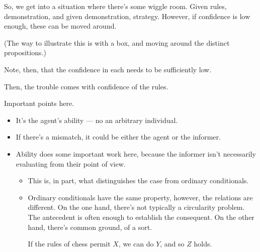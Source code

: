 \documentclass[10pt]{article}
\begin{document}
So, we get into a situation where there's some wiggle room.
Given rules, demonstration, and given demonstration, strategy.
However, if confidence is low enough, these can be moved around.

(The way to illustrate this is with a box, and moving around the distinct propositions.)

Note, then, that the confidence in each needs to be sufficiently low.

Then, the trouble comes with confidence of the rules.


Important points here.

\begin{itemize}
\item It's the agent's ability --- no an arbitrary individual.
\item If there's a mismatch, it could be either the agent or the informer.
\item Ability does some important work here, because the informer isn't necessarily evaluating from their point of view.
  \begin{itemize}
  \item This is, in part, what distinguishes the case from ordinary conditionals.
  \item Ordinary conditionals have the same property, however, the relations are different.
    On the one hand, there's not typically a circularity problem.
    The antecedent is often enough to establish the consequent.
    On the other hand, there's common ground, of a sort.

    If the rules of chess permit \(X\), we can do \(Y\), and so \(Z\) holds.
  \end{itemize}
\end{itemize}
\end{document}
